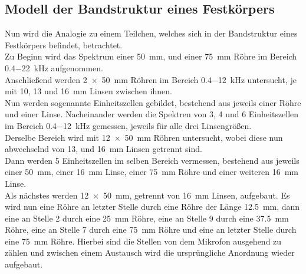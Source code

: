 \subsection{Modell der Bandstruktur eines Festkörpers}
Nun wird die Analogie zu einem Teilchen, welches sich in der Bandstruktur eines Festkörpers befindet, betrachtet. \\
\newline
\noindent
Zu Beginn wird das Spektrum einer \SI{50}{\milli\meter}, und einer \SI{75}{\milli\meter} Röhre im Bereich \SI{0.4-22}{\kilo\hertz} aufgenommen. \\
Anschließend werden \SI{2 x 50}{\milli\meter} Röhren im Bereich \SI{0.4-12}{\kilo\hertz} untersucht, je mit 10, 13 und \SI{16}{\milli\meter} Linsen zwischen ihnen. \\
Nun werden sogenannte Einheitszellen gebildet, bestehend aus jeweils einer Röhre und einer Linse. Nacheinander werden die Spektren von 3, 4 und 6 Einheitszellen im Bereich
\SI{0.4-12}{\kilo\hertz} gemessen, jeweils für alle drei Linsengrößen. \\
Derselbe Bereich wird mit \SI{12 x 50}{\milli\meter} Röhren untersucht, wobei diese nun abwechselnd von 13, und \SI{16}{\milli\meter} Linsen getrennt sind.\\
Dann werden 5 Einheitszellen im selben Bereich vermessen, bestehend aus jeweils einer \SI{50}{\milli\meter}, einer \SI{16}{\milli\meter} Linse, einer \SI{75}{\milli\meter} Röhre und einer weiteren \SI{16}{\milli\meter} Linse. \\
Als nächstes werden \SI{12 x 50}{\milli\meter}, getrennt von \SI{16}{\milli\meter} Linsen, aufgebaut. Es wird nun eine Röhre an letzter Stelle durch eine Röhre der Länge \SI{12.5}{\milli\meter}, dann eine an Stelle 2 durch eine \SI{25}{\milli\meter} Röhre,
eine an Stelle 9 durch eine \SI{37.5}{\milli\meter} Röhre, eine an Stelle 7 durch eine \SI{75}{\milli\meter} Röhre und eine an letzter Stelle durch eine \SI{75}{\milli\meter} Röhre. 
Hierbei sind die Stellen von dem Mikrofon ausgehend zu zählen und zwischen einem Austausch wird die ursprüngliche Anordnung wieder aufgebaut.



